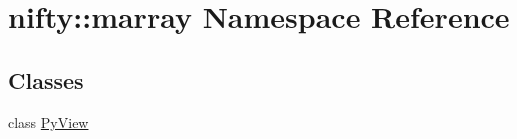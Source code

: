 \hypertarget{namespacenifty_1_1marray}{}\section{nifty\+:\+:marray Namespace Reference}
\label{namespacenifty_1_1marray}
\subsection*{Classes}
\begin{DoxyCompactItemize}
\item 
class \hyperlink{classnifty_1_1marray_1_1PyView}{Py\+View}
\end{DoxyCompactItemize}
